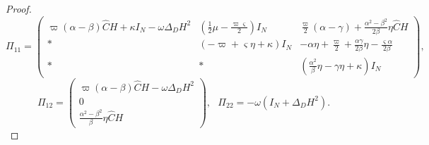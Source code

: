\documentclass[review]{elsarticle}
\begin{document}
\begin{proof}
	\begin{equation*}
	\Pi_{11}= \begin{pmatrix}
	\varpi(\alpha- \beta ) \hat{C} H+\kappa I_N -\omega\Delta_D H^2  &(\frac{1}{2}\mu -\frac{\varpi \varsigma}{2})I_N &	\frac{\varpi }{2}(\alpha-\gamma)+\frac{\alpha^2-\beta^2}{2\beta}\eta \hat C H  \\
	*								& \left( -\varpi + \varsigma \eta + \kappa \right)  I_N &-\alpha \eta+\frac{\varpi}{2}+ \frac{\alpha\gamma}{2\beta}\eta - \frac{\varsigma\alpha}{2\beta}\\
	*& *& \left( \frac{\alpha^2 }{\beta}\eta - \gamma\eta+\kappa\right) I_N
	\end{pmatrix},  
	\end{equation*}
	\begin{equation*}
	\Pi_{12} = \begin{pmatrix}
	\varpi(\alpha - \beta) \hat{C} H  -\omega\Delta_D H^2  \\
	0\\
	\frac{\alpha^2-\beta^2}{\beta}\eta \hat{C} H
	\end{pmatrix},~~~\Pi_{22}= - \omega(I_N+ \Delta_D H^2).
	\end{equation*}
	

\end{proof}
\end{document}
